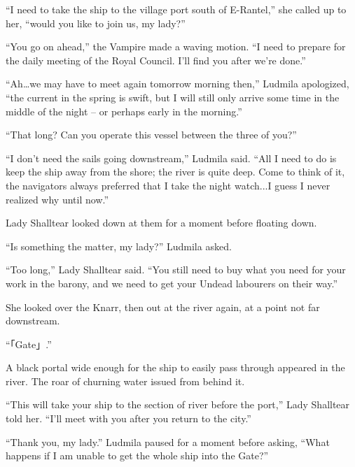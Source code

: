  

“I need to take the ship to the village port south of E-Rantel,” she called up to her, “would you like to join us, my lady?”

 

“You go on ahead,” the Vampire made a waving motion. “I need to prepare for the daily meeting of the Royal Council. I’ll find you after we’re done.”

 

“Ah…we may have to meet again tomorrow morning then,” Ludmila apologized, “the current in the spring is swift, but I will still only arrive some time in the middle of the night – or perhaps early in the morning.”

 

“That long? Can you operate this vessel between the three of you?”

 

“I don’t need the sails going downstream,” Ludmila said. “All I need to do is keep the ship away from the shore; the river is quite deep. Come to think of it, the navigators always preferred that I take the night watch...I guess I never realized why until now.”

 

Lady Shalltear looked down at them for a moment before floating down.

 

“Is something the matter, my lady?” Ludmila asked.

 

“Too long,” Lady Shalltear said. “You still need to buy what you need for your work in the barony, and we need to get your Undead labourers on their way.”

 

She looked over the Knarr, then out at the river again, at a point not far downstream.

 

“「Gate」.”

 

A black portal wide enough for the ship to easily pass through appeared in the river. The roar of churning water issued from behind it.

 

“This will take your ship to the section of river before the port,” Lady Shalltear told her. “I’ll meet with you after you return to the city.”

 

“Thank you, my lady.” Ludmila paused for a moment before asking, “What happens if I am unable to get the whole ship into the Gate?”

